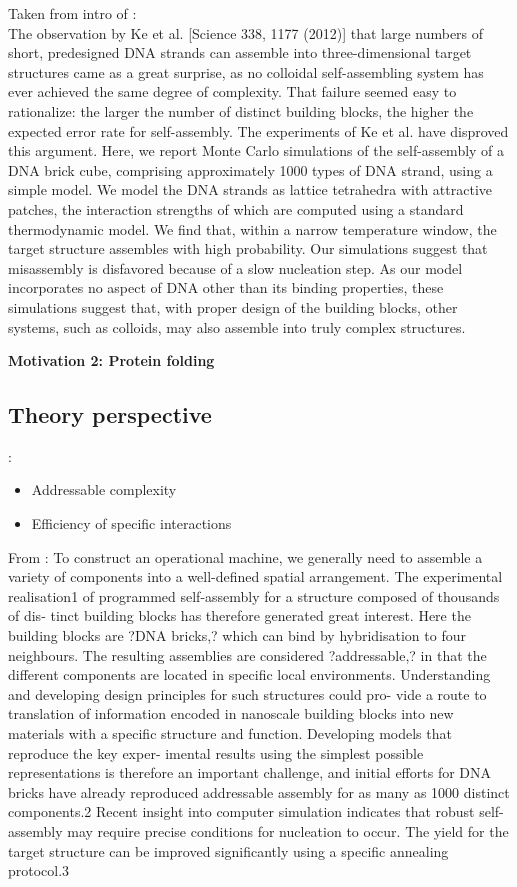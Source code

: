 Taken from intro of \cite{Reinhardt_2014_PRL}: \\
The observation by Ke et al. [Science 338, 1177 (2012)] that large numbers of short, predesigned DNA strands can assemble into three-dimensional target structures came as a great surprise, as no colloidal self-assembling system has ever achieved the same degree of complexity.
That failure seemed easy to rationalize: the larger the number of distinct building blocks, the higher the expected error rate for self-assembly.
The experiments of Ke et al. have disproved this argument.
Here, we report Monte Carlo simulations of the self-assembly of a DNA brick cube, comprising approximately 1000 types of DNA strand, using a simple model.
We model the DNA strands as lattice tetrahedra with attractive patches, the interaction strengths of which are computed using a standard thermodynamic model.
We find that, within a narrow temperature window, the target structure assembles with high probability.
Our simulations suggest that misassembly is disfavored because of a slow nucleation step.
As our model incorporates no aspect of DNA other than its binding properties, these simulations suggest that, with proper design of the building blocks, other systems, such as colloids, may also assemble into truly complex structures.


\textbf{Motivation 2: Protein folding}

\subsection{Theory perspective}:
\begin{itemize}
\item Addressable complexity
\item Efficiency of specific interactions
\end{itemize}

From \cite{Wales_2017_JChemPhys}:
To construct an operational machine, we generally need to assemble a variety of components into a well-defined spatial arrangement. The experimental realisation1 of programmed self-assembly for a structure composed of thousands of dis- tinct building blocks has therefore generated great interest. Here the building blocks are ?DNA bricks,? which can bind by hybridisation to four neighbours. The resulting assemblies are considered ?addressable,? in that the different components are located in specific local environments. Understanding and developing design principles for such structures could pro- vide a route to translation of information encoded in nanoscale building blocks into new materials with a specific structure and function. Developing models that reproduce the key exper- imental results using the simplest possible representations is therefore an important challenge, and initial efforts for DNA bricks have already reproduced addressable assembly for as many as 1000 distinct components.2 Recent insight into computer simulation indicates that robust self-assembly may require precise conditions for nucleation to occur. The yield for the target structure can be improved significantly using a specific annealing protocol.3


